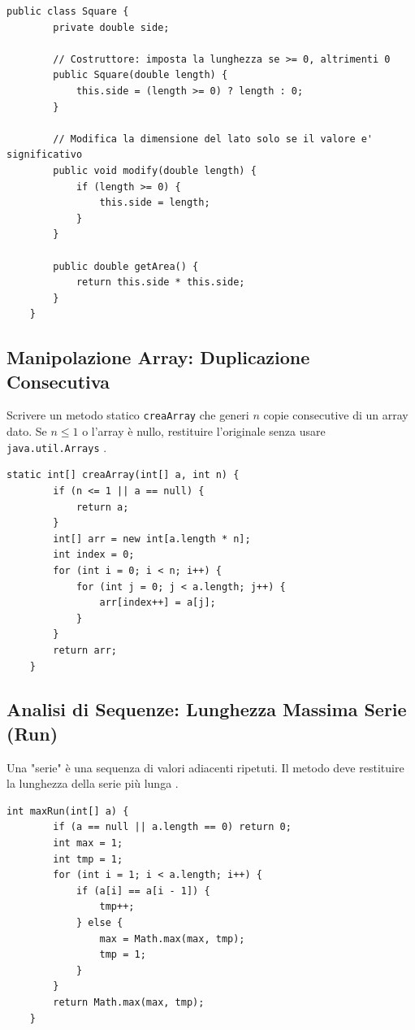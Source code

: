 \begin{lstlisting}[caption={Implementazione della classe Square}]
	public class Square {
		private double side;
		
		// Costruttore: imposta la lunghezza se >= 0, altrimenti 0
		public Square(double length) {
			this.side = (length >= 0) ? length : 0;
		}
		
		// Modifica la dimensione del lato solo se il valore e' significativo
		public void modify(double length) {
			if (length >= 0) {
				this.side = length;
			}
		}
		
		public double getArea() {
			return this.side * this.side;
		}
	}
\end{lstlisting}

\newpage
\subsection{Manipolazione Array: Duplicazione Consecutiva}
\begin{osservazione}
	Scrivere un metodo statico \texttt{creaArray} che generi $n$ copie consecutive di un array dato. Se $n \le 1$ o l'array è nullo, restituire l'originale senza usare \texttt{java.util.Arrays} \cite{217, 167}.
\end{osservazione}

\begin{lstlisting}[caption={Metodo creaArray}]
	static int[] creaArray(int[] a, int n) {
		if (n <= 1 || a == null) {
			return a;
		}
		int[] arr = new int[a.length * n];
		int index = 0;
		for (int i = 0; i < n; i++) {
			for (int j = 0; j < a.length; j++) {
				arr[index++] = a[j];
			}
		}
		return arr;
	}
\end{lstlisting}

\subsection{Analisi di Sequenze: Lunghezza Massima Serie (Run)}
\begin{nozione}
	Una "serie" è una sequenza di valori adiacenti ripetuti. Il metodo deve restituire la lunghezza della serie più lunga \cite{219, 168}.
\end{nozione}

\begin{lstlisting}[caption={Metodo maxRun}]
	int maxRun(int[] a) {
		if (a == null || a.length == 0) return 0;
		int max = 1; 
		int tmp = 1;
		for (int i = 1; i < a.length; i++) {
			if (a[i] == a[i - 1]) {
				tmp++;
			} else {
				max = Math.max(max, tmp);
				tmp = 1;
			}
		}
		return Math.max(max, tmp);
	}
\end{lstlisting}

